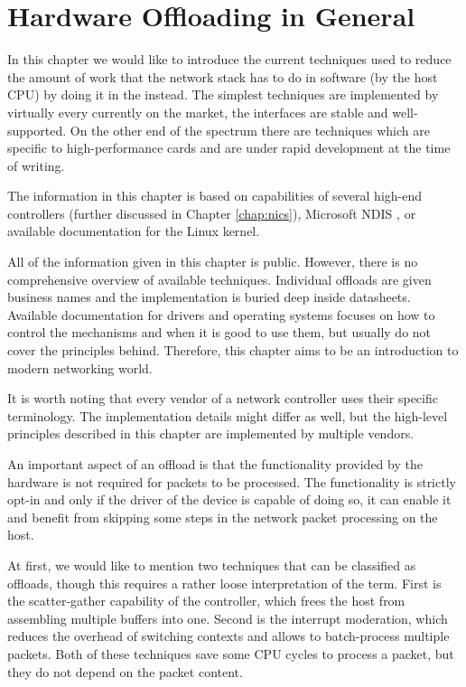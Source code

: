 \chapter{Hardware Offloading in General}
\label{chap:offload}

In this chapter we would like to introduce the current techniques used to reduce
the amount of work that the network stack has to do in software (by the host CPU)
by doing it in the  instead. The simplest techniques are implemented by
virtually every  currently on the market, the interfaces are stable and
well-supported. On the other end of the spectrum there are techniques which
are specific to high-performance cards and are under rapid development at the
time of writing.

The information in this chapter is based on capabilities of several high-end
controllers (further discussed in Chapter \ref{chap:nics}), Microsoft \acrfull{NDIS}
\cite{NDIS}, or available documentation for the Linux kernel.

All of the information given in this chapter is public. However, there is no
comprehensive overview of available techniques. Individual offloads are given
business names and the implementation is buried deep inside datasheets.
Available documentation for drivers and operating systems focuses on how to
control the mechanisms and when it is good to use them, but usually do not
cover the principles behind. Therefore, this chapter aims to be an introduction
to modern networking world.

It is worth noting that every vendor of a network controller uses their
specific terminology. The implementation details might differ as well, but the
high-level principles described in this chapter are implemented by multiple
 vendors.

An important aspect of an offload is that the functionality provided by
the hardware is not required for packets to be processed. The functionality is
strictly opt-in and only if the driver of the device is capable of doing so, it
can enable it and benefit from skipping some steps in the network packet
processing on the host.

At first, we would like to mention two techniques that can be
classified as offloads, though this requires a rather loose interpretation of the
term. First is the scatter-gather capability of the controller, which frees the
host from assembling multiple buffers into one. Second is the interrupt
moderation, which reduces the overhead of switching contexts and allows to
batch-process multiple packets. Both of these techniques save some CPU cycles to
process a packet, but they do not depend on the packet content.

